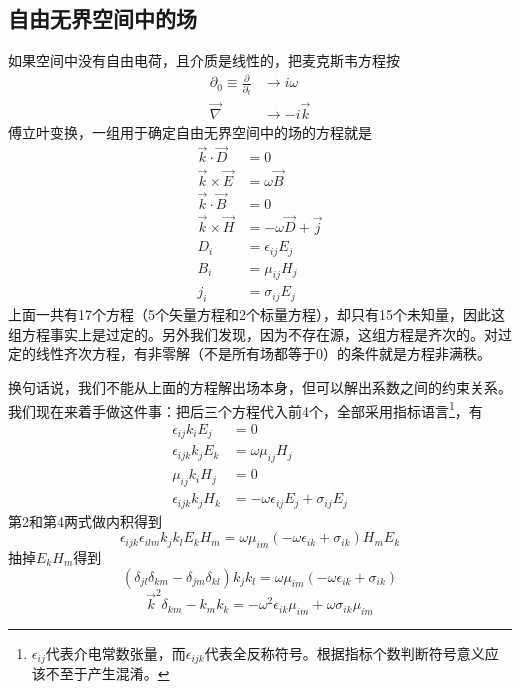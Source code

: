 \documentclass[a4paper,11pt]{ctexart}
\newcommand{\beq}{\begin{equation}}
\newcommand{\eeq}{\end{equation}}
\newcommand{\bea}{\begin{equation}\begin{aligned}}
\newcommand{\eea}{\end{aligned}\end{equation}}
\newcommand{\del}{\vec{\nabla}}
\begin{document}
\subsection{自由无界空间中的场}
如果空间中没有自由电荷，且介质是线性的，把麦克斯韦方程按
\bea
\partial_0 \equiv \frac{\partial}{\partial_t} &\to i\omega \\
\del &\to -i\vec k
\eea
傅立叶变换，一组用于确定自由无界空间中的场的方程就是
\bea
\vec k \cdot \vec D &= 0 \\
\vec k \times \vec E &= \omega \vec B \\
\vec k \cdot \vec B &= 0 \\
\vec k \times \vec H &= -\omega \vec D + \vec{j} \\
D_i &= \epsilon_{ij} E_j \\
B_i &= \mu_{ij} H_j \\
j_i &= \sigma_{ij} E_j
\eea
上面一共有17个方程（5个矢量方程和2个标量方程），却只有15个未知量，因此这组方程事实上是过定的。另外我们发现，因为不存在源，这组方程是齐次的。对过定的线性齐次方程，有非零解（不是所有场都等于0）的条件就是方程非满秩。
\par
换句话说，我们不能从上面的方程解出场本身，但可以解出系数之间的约束关系。我们现在来着手做这件事：把后三个方程代入前4个，全部采用指标语言\footnote{$\epsilon_{ij}$代表介电常数张量，而$\epsilon_{ijk}$代表全反称符号。根据指标个数判断符号意义应该不至于产生混淆。}，有
\bea
\epsilon_{ij}k_i E_j &= 0 \\
\epsilon_{ijk}k_j E_k &= \omega \mu_{ij} H_j \\
\mu_{ij} k_i H_j &=0\\
\epsilon_{ijk} k_j H_k &=-\omega \epsilon_{ij} E_j + \sigma_{ij} E_j
\eea
第2和第4两式做内积得到
\beq
\epsilon_{ijk}\epsilon_{ilm} k_j k_l E_k H_m = \omega \mu_{im}(-\omega \epsilon_{ik} + \sigma_{ik}) H_m E_k
\eeq
抽掉$E_k H_m$得到
\beq
(\delta_{jl} \delta_{km} - \delta_{jm} \delta_{kl}) k_j k_l  = \omega \mu_{im}(-\omega \epsilon_{ik} + \sigma_{ik}) 
\eeq
\beq
\vec{k}^2 \delta_{km} - k_m k_k = -\omega^2 \epsilon_{ik} \mu_{im} + \omega \sigma_{ik}	\mu_{im}
\eeq
\end{document}
